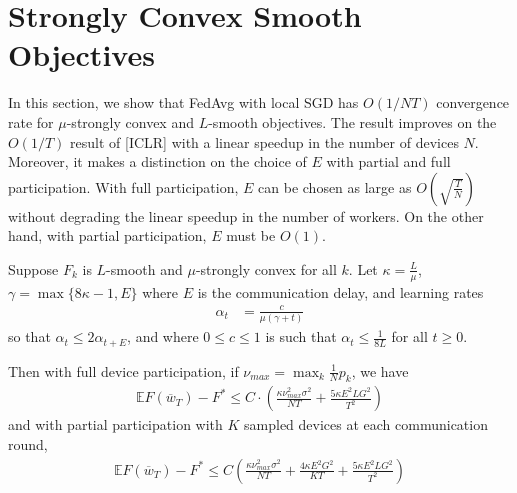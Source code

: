 


\section{Strongly Convex Smooth Objectives}

In this section, we show that FedAvg with local SGD has $O(1/NT)$ convergence
rate for $\mu$-strongly convex and $L$-smooth objectives. The result
improves on the $O(1/T)$ result of {[}ICLR{]} with a linear speedup
in the number of devices $N$. Moreover, it makes a distinction on
the choice of $E$ with partial and full participation. With full
participation, $E$ can be chosen as large as $O(\sqrt{\frac{T}{N}})$
without degrading the linear speedup in the number of workers. On
the other hand, with partial participation, $E$ must be $O(1)$. 
\begin{theorem}
	Suppose $F_{k}$ is $L$-smooth and $\mu$-strongly convex for all
	$k$. Let $\kappa=\frac{L}{\mu}$, $\gamma=\max\{8\kappa-1,E\}$ where
	$E$ is the communication delay, and learning rates 
	\begin{align*}
	\alpha_{t} & =\frac{c}{\mu(\gamma+t)}
	\end{align*}
	so that $\alpha_{t}\leq2\alpha_{t+E}$, and where $0\leq c\leq1$
	is such that $\alpha_{t}\leq\frac{1}{8L}$ for all $t\geq0$. 
	
	Then with full device participation, if $\nu_{max}=\max_{k}\frac{1}{N}p_{k}$,
	we have 
	\begin{align*}
	\mathbb{E}F(\overline{w}_{T})-F^{\ast}\leq C\cdot(\frac{\kappa\nu_{max}^{2}\sigma^{2}}{NT}+\frac{5\kappa E^{2}LG^{2}}{T^{2}})
	\end{align*}
	and with partial participation with $K$ sampled devices at each
	communication round, 
	\begin{align*}
	\mathbb{E}F(\overline{w}_{T})-F^{\ast}\leq C(\frac{\kappa\nu_{max}^{2}\sigma^{2}}{NT}+\frac{4\kappa E^{2}G^{2}}{KT}+\frac{5\kappa E^{2}LG^{2}}{T^{2}})
	\end{align*}
\end{theorem}
%
